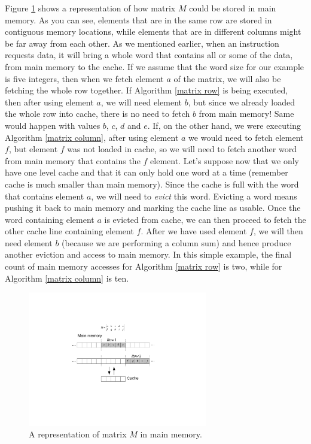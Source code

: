 \documentclass[12pt]{diicc}
\begin{document}
Figure \ref{fig:matrixmemory} shows a representation of how matrix $M$ could be stored in main memory. As you can see, elements that are in the same row are stored in contiguous memory locations, while elements that are in different columns might be far away from each other. As we mentioned earlier, when an instruction requests data, it will bring a whole word that contains all or some of the data, from main memory to the cache. If we assume that the word size for our example is five integers, then when we fetch element $a$ of the matrix, we will also be fetching the whole row together. If Algorithm \ref{matrix row} is being executed, then after using element $a$, we will need element $b$, but since we already loaded the whole row into cache, there is no need to fetch $b$ from main memory! Same would happen with values $b$, $c$, $d$ and $e$. If, on the other hand, we were executing Algorithm \ref{matrix column}, after using element $a$ we would need to fetch element $f$, but element $f$ was not loaded in cache, so we will need to fetch another word from main memory that contains the $f$ element. Let's suppose now that we only have one level cache and that it can only hold one word at a time (remember cache is much smaller than main memory). Since the cache is full with the word that contains element $a$, we will need to \textit{evict} this word. Evicting a word means pushing it back to main memory and marking the cache line as usable. Once the word containing element $a$ is evicted from cache, we can then proceed to fetch the other cache line containing element $f$. After we have used element $f$, we will then need element $b$ (because we are performing a column sum) and hence produce another eviction and access to main memory. In this simple example, the final count of main memory accesses for Algorithm \ref{matrix row} is two, while for Algorithm \ref{matrix column} is ten. 

\begin{figure}[h!]
	\centering
		\includegraphics[width=0.7\textwidth]{matrixmemory}
	\caption{A representation of matrix $M$ in main memory.}
	\label{fig:matrixmemory}
\end{figure}
\end{document}

